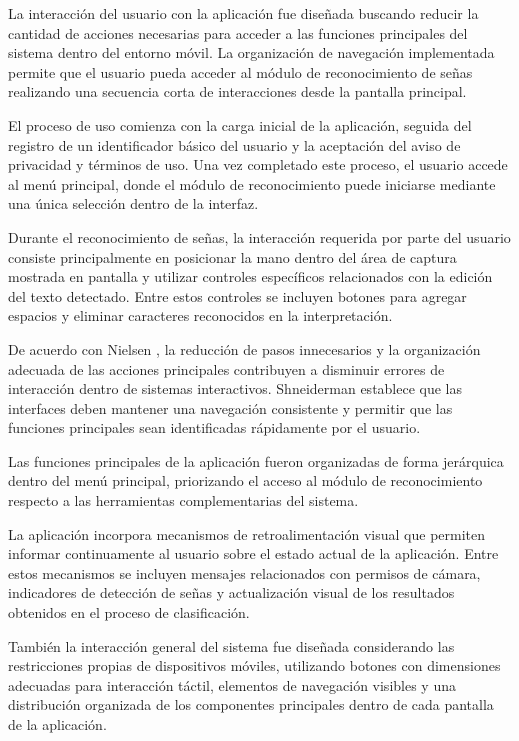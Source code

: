 	La interacción del usuario con la aplicación fue diseñada buscando reducir la
	cantidad de acciones necesarias para acceder a las funciones principales del
	sistema dentro del entorno móvil. La organización de navegación implementada
	permite que el usuario pueda acceder al módulo de reconocimiento de señas
	realizando una secuencia corta de interacciones desde la pantalla principal.
	
	El proceso de uso comienza con la carga inicial de la aplicación, seguida del
	registro de un identificador básico del usuario y la aceptación del aviso de
	privacidad y términos de uso. Una vez completado este proceso, el usuario accede
	al menú principal, donde el módulo de reconocimiento puede iniciarse mediante una
	única selección dentro de la interfaz.
	
	Durante el reconocimiento de señas, la interacción requerida por parte del usuario
	consiste principalmente en posicionar la mano dentro del área de captura mostrada
	en pantalla y utilizar controles específicos relacionados con la edición del texto
	detectado. Entre estos controles se incluyen botones para agregar espacios y
	eliminar caracteres reconocidos en la interpretación.
	
	De acuerdo con Nielsen \cite{nielsen1994usability}, la reducción de pasos
	innecesarios y la organización adecuada de las acciones principales contribuyen a
	disminuir errores de interacción dentro de sistemas interactivos.
	Shneiderman \cite{shneiderman2016designing} establece que las interfaces deben
	mantener una navegación consistente y permitir que las funciones principales sean
	identificadas rápidamente por el usuario.
	
	Las funciones principales de la aplicación fueron organizadas de
	forma jerárquica dentro del menú principal, priorizando el acceso al módulo de
	reconocimiento respecto a las herramientas complementarias del sistema.
	
	La aplicación incorpora mecanismos de retroalimentación visual que
	permiten informar continuamente al usuario sobre el estado actual de la aplicación.
	Entre estos mecanismos se incluyen mensajes relacionados con permisos de cámara,
	indicadores de detección de señas y actualización visual de los resultados
	obtenidos en el proceso de clasificación.
	
	También la interacción general del sistema fue diseñada considerando las
	restricciones propias de dispositivos móviles, utilizando botones con dimensiones
	adecuadas para interacción táctil, elementos de navegación visibles y una
	distribución organizada de los componentes principales dentro de cada pantalla de
	la aplicación.
	
